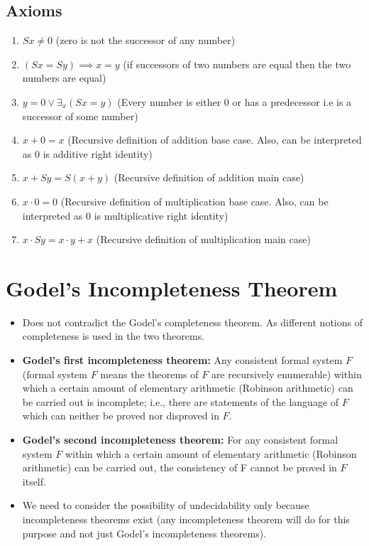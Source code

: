 \documentclass[
11pt,notheorems,hyperref={pdfauthor=whatever}
]{beamer}
\begin{document}
\subsection{Axioms}
\begin{frame}
    \begin{enumerate}
        \item $Sx \not= 0$ (zero is not the successor of any number)
        \item $(Sx = Sy) \implies x = y$ (if successors of two numbers are equal then the two numbers are equal)
        \item $y = 0 \vee \exists_x (Sx = y)$ (Every number is either 0 or has a predecessor i.e is a successor of some number)
        \item $x + 0 = x$ (Recursive definition of addition base case. Also, can be interpreted as $0$ is additive right identity)
        \item $x + Sy = S(x+y)$ (Recursive definition of addition main case)
        \item $x \cdot 0 = 0$ (Recursive definition of multiplication base case. Also, can be interpreted as $0$ is multiplicative right identity)
        \item $x \cdot Sy = x \cdot y + x$ (Recursive definition of multiplication main case)
    \end{enumerate}
\end{frame}

\section{Godel's Incompleteness Theorem}
\begin{frame}
\begin{itemize}
    \item Does not contradict the Godel's completeness theorem. As different notions of completeness is used in the two theorems.
    \item \textbf{Godel's first incompleteness theorem: } Any consistent formal system $F$ (formal system $F$ means the theorems of $F$ are recursively enumerable) within which a certain amount of elementary arithmetic (Robinson arithmetic) can be carried out is incomplete; i.e., there are statements of the language of $F$ which can neither be proved nor disproved in $F$. \cite{raatikainen2013godel}
    \item \textbf{Godel's second incompleteness theorem: } For any consistent formal system $F$ within which a certain amount of elementary arithmetic (Robinson arithmetic) can be carried out, the consistency of F cannot be proved in $F$ itself. \cite{raatikainen2013godel}
    \item We need to consider the possibility of undecidability only because incompleteness theorems exist (any incompleteness theorem will do for this purpose and not just Godel's incompleteness theorems).
\end{itemize}
\end{frame}
\end{document}
